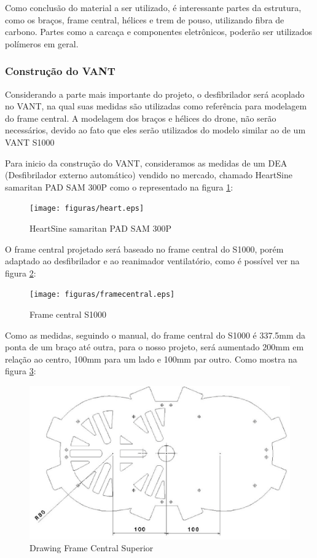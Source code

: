 Como conclusão do material a ser utilizado, é interessante partes da estrutura, como os braços, frame central, hélices e trem de pouso, utilizando fibra de carbono. Partes como a carcaça e componentes eletrônicos, poderão ser utilizados polímeros em geral. 

\subsubsection{Construção do VANT}

Considerando a parte mais importante do projeto, o desfibrilador será acoplado no VANT, na qual suas medidas são utilizadas como referência para modelagem do frame central.  A modelagem dos braços e hélices do drone,  não serão necessários, devido ao fato que eles serão utilizados do modelo similar ao de um VANT S1000

Para inicio da construção do VANT, consideramos as medidas de um DEA (Desfibrilador externo automático) vendido no mercado, chamado HeartSine samaritan PAD SAM 300P  como o representado na figura \ref{fig:heart}:

\begin{figure}[H]
    \centering
      \texttt{[image: figuras/heart.eps]}
    \caption{ HeartSine samaritan PAD SAM 300P}
    \label{fig:heart}
\end{figure}

O frame central projetado será baseado no frame central do S1000, porém adaptado ao desfibrilador e ao reanimador ventilatório, como é possível ver na figura \ref{fig:framecentral}: 

\begin{figure}[H]
    \centering
      \texttt{[image: figuras/framecentral.eps]}
    \caption{ Frame central S1000}
    \label{fig:framecentral}
\end{figure}


Como as medidas, seguindo o manual, do frame central do S1000 é 337.5mm da ponta de um braço até outra, para o nosso projeto, será aumentado  200mm em relação ao centro, 100mm para um lado e 100mm par outro. Como mostra na figura \ref{fig:drawing}:

\begin{figure}[H]
    \centering
      \includegraphics[keepaspectratio=true,scale=0.5]{figuras/drawing.eps}
    \caption{ Drawing Frame Central Superior}
    \label{fig:drawing}
\end{figure}

